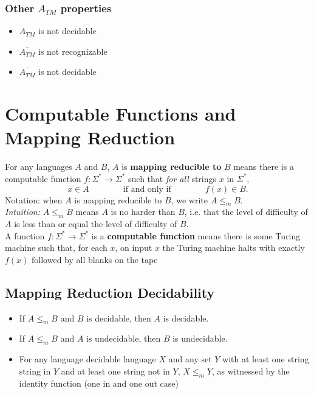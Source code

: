 \documentclass{article}
\begin{document}
    \subsubsection{Other $A_{TM}$ properties}
    \begin{itemize}
        \item $A_{TM}$ is not decidable
        \item $\bar{A_{TM}}$ is not recognizable
        \item $\bar{A_{TM}}$ is not decidable
    \end{itemize}
    \section{Computable Functions and Mapping Reduction}
    \label{sec:reduction}
    For any languages $A$ and $B$, $A$ is  {\bf  mapping  reducible to} $B$  means there is a computable function 
    $f : \Sigma^* \to \Sigma^*$ such that {\it for all} strings  $x$ in $\Sigma^*$, 
    \[
    x  \in  A \qquad \qquad \text{if and  only  if} \qquad \qquad f(x) \in B.
    \]
    Notation:  when $A$  is mapping reducible to $B$, we write $A  \leq_m B$.\\
    {\it Intuition:} $A \leq_m B$ means $A$ is no harder than $B$, i.e. that the level 
    of difficulty of $A$ is less than or equal the level of difficulty of $B$.\\
    \newline
    A function $f: \Sigma^* \to \Sigma^*$ is a {\bf computable function} means there is some Turing machine such that, 
for each $x$, on input $x$ the Turing machine halts with exactly $f(x)$ followed by all blanks on the tape
    \subsection{Mapping Reduction Decidability}
    \begin{itemize}
        \item  If $A \leq_m B$ and $B$ is decidable, then $A$ is decidable.
        \item If $A \leq_m B$ and $A$ is undecidable, then $B$ is undecidable.
        \item For any language decidable language $X$ and any 
set $Y$ with at least one string string in $Y$ and at least one string not in $Y$, $X \leq_m Y$, as witnessed by the identity function (one in and one out case)
    \end{itemize}
    \newpage
\end{document}
